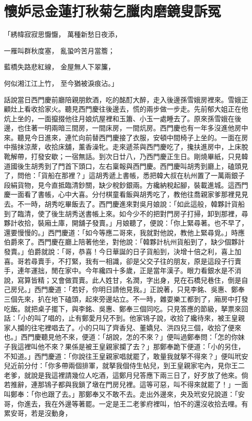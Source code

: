 %

\chapter{懷妒忌金蓮打秋菊\KG 乞臘肉磨鏡叟訴冤}


「綉幃寂寂思懨懨，  萬種新愁日夜添，

一雁叫群秋度塞，  亂蛩吟苦月當簷；

藍橋失路悲紅線，  金屋無人下翠簾，

何似湘江江上竹，  至今猶被淚痕沾。」

話說當日西門慶前廳陪親朋飲酒，吃的酩酊大醉，走入後邊孫雪娥房裡來。雪娥正顧灶上看收拾家火。聽見西門慶往後邊去，慌的兩步做一步走。先前郁大姐正在他炕上坐的，一面攛掇他往月娘炕屋裡和玉簫、小玉一處睡去了。原來孫雪娥在後邊，也住著一明兩暗三間房，一間床房，一間炕房。西門慶也有一年多沒進他房中來。聽見今日進來，連忙向前替西門慶接了衣服，安頓中間椅子上坐的。一面在房中揩抹涼蓆，收拾床舖，薰香澡牝。走來遞茶與西門慶吃了，攙扶進房中，上床脫靴解帶，打發安歇；一宿無話。到次日廿八，乃西門慶正生日。剛燒畢紙，只見韓道國後生胡秀到了門首下頭口，左右稟報與西門慶。西門慶叫胡秀到廳上，磕頭見了，問他：「貨船在那裡？」這胡秀遞上書帳，悉把韓大叔在杭州置了一萬兩銀子段絹貨物，見今直抵臨清鈔關，缺少稅鈔銀兩。方纔納稅起腳，裝載進城。這西門慶一面看了書帳，心中大喜。分付棋童看飯與胡秀吃了，教他往喬親家爹那裡見見去。不一時，胡秀吃畢飯去了。西門慶進來對吳月娘說：「如此這般，韓夥計貨船到了臨清，使了後生胡秀送書帳上來。如今少不的把對門房子打掃，卸到那裡，尋夥計收拾，裝廂土庫，開舖子發賣。」月娘聽了，便說：「你上緊尋著。也不早了，還要慢慢的。」西門慶道：「如今等應二哥來，我就對他說，教他上緊尋覓。」時應伯爵來了。西門慶在廳上陪著他坐，對他說：「韓夥計杭州貨船到了，缺少個夥計發賣。」伯爵就說：「哥，恭喜！今日華誕的日子貨船到，決增十倍之利，喜上加喜。哥若尋賣手，不打緊，我有一相識，卻是父交子往的朋友，原是這段子行賣手，連年運拙，閒在家中。今年纔四十多歲，正是當年漢子。眼力看銀水是不消說，寫算皆精；又會做買賣。此人姓甘，名潤，字出身，見在石橋兒巷住，倒是自己房兒。」西門慶道：「若好，你明日請他見我。」正說著，只見李銘、吳惠、鄭奉三個先來，扒在地下磕頭，起來旁邊站立。不一時，雜耍樂工都到了，廂房中打發吃飯。就把桌子擺下，與李銘、吳惠、鄭奉三個同吃。只見答應的節級，拏票來回話：「小的叫了唱的，止有鄭愛月兒不到。他家鴇子說，收拾了纔待來，被王皇親家人攔的往宅裡唱去了。小的只叫了齊香兒、董嬌兒、洪四兒三個，收拾了便來也。」西門慶聽見他不來，便道：「胡說，怎的不來？」便叫過鄭奉問：「怎的你妹子我這裡叫他不來？果係是被王皇親家攔了去？」那鄭奉跪下便道：「小的另住，不知道。」西門慶道：「你說往王皇親家唱就罷了，敢量我就拏不得來？」便叫玳安兒近前分付：「你多帶兩個排軍，就拏我個侍生帖兒，到王皇親家宅內，見你王二老爹，就說是我這裡請幾位人吃酒，這鄭月兒答應下兩三日了，好歹放了他來。倘若推辭，連那鴇子都與我鎖了墩在門房兒裡。這等可惡，叫不得來就罷了！」一面叫鄭奉：「你也跟了去。」那鄭奉又不敢不去。走出外邊來，央及玳安兒說道：「安哥，你進去，我在外邊等著罷。一定是王二老爹府裡叫，怕不的還沒收拾去哩。有累安哥，若是沒動身，